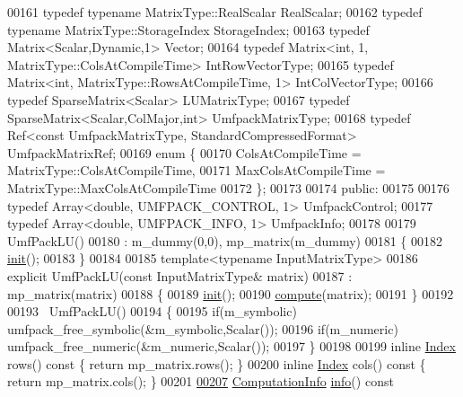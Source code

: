 \begin{DoxyCode}
00161     \textcolor{keyword}{typedef} \textcolor{keyword}{typename} MatrixType::RealScalar RealScalar;
00162     \textcolor{keyword}{typedef} \textcolor{keyword}{typename} MatrixType::StorageIndex StorageIndex;
00163     \textcolor{keyword}{typedef} Matrix<Scalar,Dynamic,1> Vector;
00164     \textcolor{keyword}{typedef} Matrix<int, 1, MatrixType::ColsAtCompileTime> IntRowVectorType;
00165     \textcolor{keyword}{typedef} Matrix<int, MatrixType::RowsAtCompileTime, 1> IntColVectorType;
00166     \textcolor{keyword}{typedef} SparseMatrix<Scalar> LUMatrixType;
00167     \textcolor{keyword}{typedef} SparseMatrix<Scalar,ColMajor,int> UmfpackMatrixType;
00168     \textcolor{keyword}{typedef} Ref<const UmfpackMatrixType, StandardCompressedFormat> UmfpackMatrixRef;
00169     \textcolor{keyword}{enum} \{
00170       ColsAtCompileTime = MatrixType::ColsAtCompileTime,
00171       MaxColsAtCompileTime = MatrixType::MaxColsAtCompileTime
00172     \};
00173 
00174   \textcolor{keyword}{public}:
00175 
00176     \textcolor{keyword}{typedef} Array<double, UMFPACK\_CONTROL, 1> UmfpackControl;
00177     \textcolor{keyword}{typedef} Array<double, UMFPACK\_INFO, 1> UmfpackInfo;
00178 
00179     UmfPackLU()
00180       : m\_dummy(0,0), mp\_matrix(m\_dummy)
00181     \{
00182       \hyperlink{structinit}{init}();
00183     \}
00184 
00185     \textcolor{keyword}{template}<\textcolor{keyword}{typename} InputMatrixType>
00186     \textcolor{keyword}{explicit} UmfPackLU(\textcolor{keyword}{const} InputMatrixType& matrix)
00187       : mp\_matrix(matrix)
00188     \{
00189       \hyperlink{structinit}{init}();
00190       \hyperlink{class_eigen_1_1_umf_pack_l_u_a05fb2b5717ebd67e46b83439721ceee7}{compute}(matrix);
00191     \}
00192 
00193     ~UmfPackLU()
00194     \{
00195       \textcolor{keywordflow}{if}(m\_symbolic) umfpack\_free\_symbolic(&m\_symbolic,Scalar());
00196       \textcolor{keywordflow}{if}(m\_numeric)  umfpack\_free\_numeric(&m\_numeric,Scalar());
00197     \}
00198 
00199     \textcolor{keyword}{inline} \hyperlink{namespace_eigen_a62e77e0933482dafde8fe197d9a2cfde}{Index} rows()\textcolor{keyword}{ const }\{ \textcolor{keywordflow}{return} mp\_matrix.rows(); \}
00200     \textcolor{keyword}{inline} \hyperlink{namespace_eigen_a62e77e0933482dafde8fe197d9a2cfde}{Index} cols()\textcolor{keyword}{ const }\{ \textcolor{keywordflow}{return} mp\_matrix.cols(); \}
00201 
\hyperlink{class_eigen_1_1_umf_pack_l_u_a68738a0d99c67316877706f98b033402}{00207}     \hyperlink{group__enums_ga85fad7b87587764e5cf6b513a9e0ee5e}{ComputationInfo} \hyperlink{class_eigen_1_1_umf_pack_l_u_a68738a0d99c67316877706f98b033402}{info}()\textcolor{keyword}{ const}

\end{DoxyCode}
